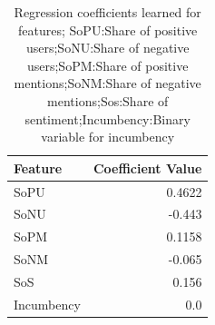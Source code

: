 \documentclass[conference]{IEEEtran}
\begin{document}




\begin{table}
        \centering
        \begin{tabular}{|l|r|}
        \hline
        Feature & Coefficient Value\\
        \hline
        \textrm{SoPU} & 0.4622\\
        \textrm{SoNU} & -0.443\\
        \textrm{SoPM} &  0.1158\\
        \textrm{SoNM} &  -0.065\\
        \textrm{SoS} & 0.156\\
        \textrm{Incumbency} & 0.0\\
        \hline
        \end{tabular}
        \caption{Regression coefficients learned for features; \textrm{SoPU}:Share of positive users;\textrm{SoNU}:Share of negative users;\textrm{SoPM}:Share of positive mentions;\textrm{SoNM}:Share of negative mentions;\textrm{Sos}:Share of sentiment;\textrm{Incumbency}:Binary variable for incumbency}
        \label{table:coeff}
\end{table}

\end{document}
